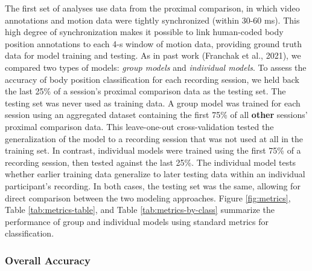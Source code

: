 \documentclass[
  man]{apa6}
\begin{document}
The first set of analyses use data from the proximal comparison, in which video annotations and motion data were tightly synchronized (within 30-60 ms). This high degree of synchronization makes it possible to link human-coded body position annotations to each 4-s window of motion data, providing ground truth data for model training and testing. As in past work (Franchak et al., 2021), we compared two types of models: \emph{group models} and \emph{individual models}. To assess the accuracy of body position classification for each recording session, we held back the last 25\% of a session's proximal comparison data as the testing set. The testing set was never used as training data. A group model was trained for each session using an aggregated dataset containing the first 75\% of all \textbf{other} sessions' proximal comparison data. This leave-one-out cross-validation tested the generalization of the model to a recording session that was not used at all in the training set. In contrast, individual models were trained using the first 75\% of a recording session, then tested against the last 25\%. The individual model tests whether earlier training data generalize to later testing data within an individual participant's recording. In both cases, the testing set was the same, allowing for direct comparison between the two modeling approaches. Figure \ref{fig:metrics}, Table \ref{tab:metrics-table}, and Table \ref{tab:metrics-by-class} summarize the performance of group and individual models using standard metrics for classification.

\hypertarget{overall-accuracy}{%
\subsubsection{Overall Accuracy}\label{overall-accuracy}}
\end{document}
